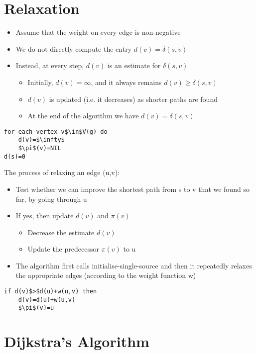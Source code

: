\documentclass{article}[18pt]
\begin{document}
\section{Relaxation}
\begin{itemize}
	\item Assume that the weight on every edge is non-negative
	\item We do not directly compute the entry $d(v)=\delta(s,v)$ 
	\item Instead, at every step, $d(v)$ is an estimate for $\delta(s,v)$
	\begin{itemize}
		\item Initially, $d(v)=\infty$, and it always remains $d(v)\geqslant \delta(s,v)$
		\item $d(v)$ is updated (i.e. it decreases) as shorter paths are found
		\item At the end of the algorithm we have $d(v)=\delta(s,v)$
	\end{itemize}
\end{itemize}
\begin{lstlisting}[caption=Initialise-Single-Source({G,s})]
for each vertex v$\in$V(g) do
	d(v)=$\infty$
	$\pi$(v)=NIL
d(s)=0
\end{lstlisting}
The process of relaxing an edge (u,v):
\begin{itemize}
	\item Test whether we can improve the shortest path from s to v that we found so far, by going through u
	\item If yes, then update $d(v)$ and $\pi(v)$
	\begin{itemize}
		\item Decrease the estimate $d(v)$
		\item Update the predecessor $\pi(v)$ to u
	\end{itemize}
	\item The algorithm first calls initialise-single-source and then it repeatedly relaxes the appropriate edges (according to the weight function w)
\end{itemize}
\begin{lstlisting}[caption=Relax({u,v,w})]
if d(v)$>$d(u)+w(u,v) then
	d(v)=d(u)+w(u,v)
	$\pi$(v)=u
\end{lstlisting}
\section{Dijkstra's Algorithm}
\end{document}
